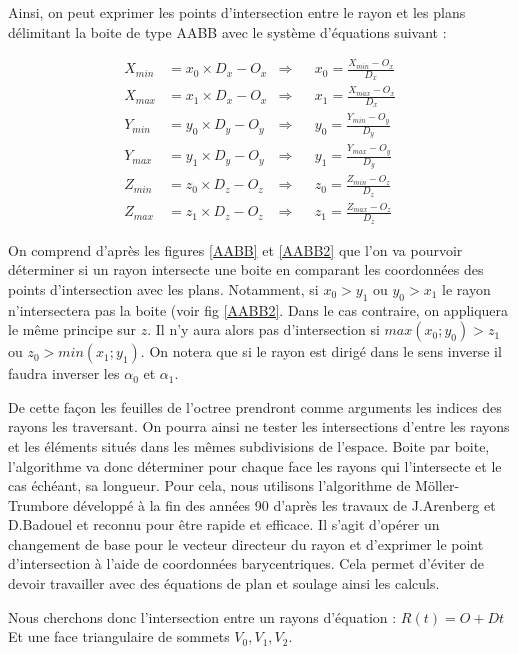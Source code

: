 Ainsi, on peut exprimer les points d'intersection entre le rayon et les plans délimitant la boite de type \gls{AABB} avec le système d'équations suivant :

\begin{align}
X_{min} &= x_0 \times D_x - O_x 	& \Rightarrow 	& &	 x_0 = \frac{X_{min} - O_x}{D_x} \\
X_{max} &= x_1 \times D_x - O_x 	& \Rightarrow 	& &	x_1 = \frac{X_{max} - O_x}{D_x} \\
Y_{min} &= y_0 \times D_y - O_y 	& \Rightarrow	& &	y_0 = \frac{Y_{min} - O_y}{D_y} \\
Y_{max} &= y_1 \times D_y - O_y 	& \Rightarrow	& &	y_1 = \frac{Y_{max} - O_y}{D_y} \\
Z_{min} &= z_0 \times D_z - O_z	& \Rightarrow 	& &	z_0 = \frac{Z_{min} - O_z}{D_z} \\
Z_{max} &= z_1 \times D_z - O_z 	& \Rightarrow 	& &	z_1 = \frac{Z_{max} - O_z}{D_z} 
\end{align}

On comprend d'après les figures \ref{AABB} et \ref{AABB2} que l'on va pourvoir déterminer si un rayon intersecte une boite en comparant les coordonnées des points d'intersection avec les plans. Notamment, si $x_0 > y_1$ ou $y_0 > x_1$ le rayon n'intersectera pas la boite (voir fig \ref{AABB2}. Dans le cas contraire, on appliquera le même principe sur $z$. Il n'y aura alors pas d'intersection si $max(x_0 ; y_0) > z_1$ ou $ z_0 > min(x_1 ; y_1)$. On notera que si le rayon est dirigé dans le sens inverse il faudra inverser les $\alpha_0$ et $\alpha_1$.

De cette façon les feuilles de l'octree prendront comme arguments les indices des rayons les traversant. On pourra ainsi ne tester les intersections d'entre les rayons et les éléments situés dans les mêmes subdivisions de l'espace. Boite par boite, l'algorithme va donc déterminer pour chaque face les rayons qui l'intersecte et le cas échéant, sa longueur. Pour cela, nous utilisons l'algorithme de Möller-Trumbore \cite[p. 2-3]{moller} développé à la fin des années 90 d'après les travaux de J.Arenberg \cite{arenberg} et D.Badouel \cite[p. 390-393]{badouel} et reconnu pour être rapide et efficace. Il s'agit d'opérer un changement de base pour le vecteur directeur du rayon et d'exprimer le point d'intersection à l'aide de coordonnées barycentriques. Cela permet d'éviter de devoir travailler avec des équations de plan et soulage ainsi les calculs.

Nous cherchons donc l'intersection entre un rayons d'équation : $R(t) = O + Dt$ \\
Et une face triangulaire de sommets $ V_0, V_1, V_2$.

